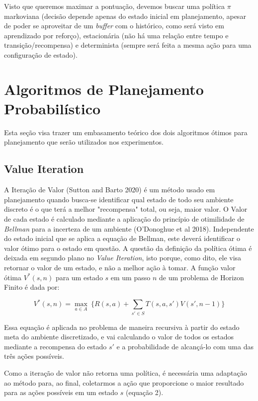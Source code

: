 \documentclass[letterpaper]{article} %
\begin{document}
Visto que queremos maximar a pontuação, devemos buscar uma política $\pi$ markoviana (decisão depende apenas do estado inicial em planejamento, apesar de poder se aproveitar de um \textit{buffer} com o histórico, como será visto em aprendizado por reforço), estacionária (não há uma relação entre tempo e transição/recompensa) e determinista (sempre será feita a mesma ação para uma configuração de estado).

\section{Algoritmos de Planejamento Probabilístico}
Esta seção visa trazer um embasamento teórico dos dois algoritmos ótimos para planejamento que serão utilizados nos experimentos.

\subsection{Value Iteration}
A Iteração de Valor (Sutton and Barto 2020) é um método usado em planejamento quando busca-se identificar qual estado de todo seu ambiente discreto é o que terá a melhor "recompensa" total, ou seja, maior valor. O Valor de cada estado é calculado mediante a aplicação do princípio de otimilidade de \textit{Bellman} para a incerteza de um ambiente (O'Donoghue et al 2018). Independente do estado inicial que se aplica a equação de Bellman, este deverá identificar o valor ótimo para o estado em questão. A questão da definição da política ótima é deixada em segundo plano no \textit{Value Iteration}, isto porque, como dito, ele visa retornar o valor de um estado, e não a melhor ação à tomar. A função valor ótima $V^{*}(s, n)$ para um estado $s$ em um passo $n$ de um problema de Horizon Finito é dada por:

\begin{equation}
V^{*}(s, n) = \max_{a \in A} \ \{ R(s,a) + \sum_{s' \in S} T(s,a,s')  V(s', n-1)\}
\end{equation}


Essa equação é aplicada no problema de maneira recursiva à partir do estado meta do ambiente discretizado, e vai calculando o valor de todos os estados mediante a recompensa do estado $s'$ e a probabilidade de alcançá-lo com uma das três ações possíveis.

Como a iteração de valor não retorna uma política, é necessária uma adaptação ao método para, ao final, coletarmos a ação que proporcione o maior resultado para as ações possíveis em um estado $s$ (equação 2).
\end{document}
